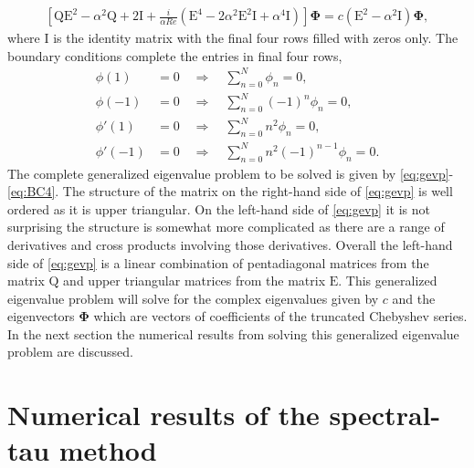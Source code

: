 \documentclass[a4paper, 12pt, twoside, openright]{article}
\numberwithin{equation}{section}
\begin{document}
\begin{align}\label{eq:gevp}
\left[\mathrm{Q}\mathrm{E}^2 - \alpha^2\mathrm{Q} + 2\mathrm{I} + \frac{i}{\alpha Re}\left(\mathrm{E}^4 - 2\alpha^2\mathrm{E}^2\mathrm{I} + \alpha^4\mathrm{I}\right)\right]\mathbf{\Phi} = c\left(\mathrm{E}^2-\alpha^2\mathrm{I}\right)\mathbf{\Phi},  
\end{align}
where $\mathrm{I}$ is the identity matrix with the final four rows filled with zeros only. The boundary conditions complete the entries in final four rows,
\begin{align}
\phi(1) &= 0 \quad \Rightarrow \quad \sum_{n=0}^{N}\phi_n = 0, \label{eq:BC1}\\
\phi(-1) &= 0 \quad \Rightarrow \quad \sum_{n=0}^{N}(-1)^n\phi_n = 0, \label{eq:BC2}\\
\phi'(1) &= 0 \quad \Rightarrow \quad \sum_{n=0}^{N}n^2\phi_n = 0, \label{eq:BC3} \\
\phi'(-1) &= 0 \quad \Rightarrow \quad \sum_{n=0}^{N}n^2(-1)^{n-1}\phi_n = 0. \label{eq:BC4}
\end{align}
The complete generalized eigenvalue problem to be solved is given by \eqref{eq:gevp}-\eqref{eq:BC4}. The structure of the matrix on the right-hand side of \eqref{eq:gevp} is well ordered as it is upper triangular. On the left-hand side of \eqref{eq:gevp} it is not surprising the structure is somewhat more complicated as there are a range of derivatives and cross products involving those derivatives. Overall the left-hand side of \eqref{eq:gevp} is a linear combination of pentadiagonal matrices from the matrix $\mathrm{Q}$ and upper triangular matrices from the matrix $\mathrm{E}$. This generalized eigenvalue problem will solve for the complex eigenvalues given by $c$ and the eigenvectors $\mathbf{\Phi}$ which are vectors of coefficients of the truncated Chebyshev series. In the next section the numerical results from solving this generalized eigenvalue problem are discussed.


% 
%
%
%
\newpage
\section{Numerical results of the spectral-tau method}
\end{document}
